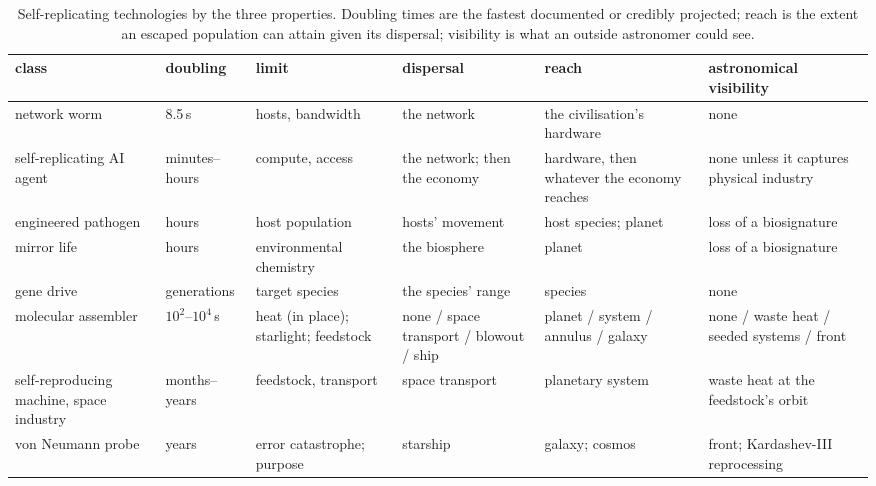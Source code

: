 \documentclass[11pt]{article}
\begin{document}
\begin{table}
\centering
\small
\caption{Self-replicating technologies by the three properties.  Doubling
times are the fastest documented or credibly projected; reach is the extent
an escaped population can attain given its dispersal; visibility is what an
outside astronomer could see.}
\label{tab:classes}
\begin{tabular}{p{2.6cm}p{1.6cm}p{2.5cm}p{2.3cm}p{2.0cm}p{3.0cm}}
\toprule
class & doubling & limit & dispersal & reach & astronomical visibility \\
\midrule
network worm \citep{Moore2003} & 8.5\,s & hosts, bandwidth & the network & the civilisation's hardware & none \\
self-replicating AI agent \citep{Pan2024} & minutes--hours & compute, access & the network; then the economy & hardware, then whatever the economy reaches & none unless it captures physical industry \\
engineered pathogen \citep{Millett2017,Esvelt2022} & hours & host population & hosts' movement & host species; planet & loss of a biosignature \\
mirror life \citep{Adamala2024} & hours & environmental chemistry & the biosphere & planet & loss of a biosignature \\
gene drive \citep{Esvelt2014,Noble2018} & generations & target species & the species' range & species & none \\
molecular assembler \citep{Drexler1986,Freitas2000} & $10^{2}$--$10^{4}$\,s & heat (in place); starlight; feedstock & none / space transport / blowout / ship & planet / system / annulus / galaxy & none / waste heat / seeded systems / front \\
self-reproducing machine, space industry \citep{Freitas1980b,Zykov2005,Metzger2013,Moses2020} & months--years & feedstock, transport & space transport & planetary system & waste heat at the feedstock's orbit \\
von Neumann probe \citep{Freitas1980,Tipler1980} & years & error catastrophe; purpose & starship & galaxy; cosmos & front; Kardashev-III reprocessing \\
\bottomrule
\end{tabular}
\end{table}
\end{document}
